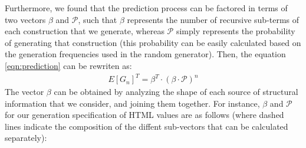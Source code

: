 Furthermore, we found that the prediction process can be factored in terms of
two vectors $\beta$ and $\mathcal{P}$, such that $\beta$ represents the number
of recursive sub-terms of each construction that we generate, whereas
$\mathcal{P}$ simply represents the probability of generating that construction
(this probability can be easily calculated based on the generation frequencies
used in the random generator).
%
Then, the equation \ref{eqn:prediction} can be rewriten as:
%
\begin{align*}
  E[G_n]^T = \beta^T \cdot (\beta \cdot \mathcal{P})^{n}
\end{align*}
%
The vector $\beta$ can be obtained by analyzing the shape of each source of
structural information that we consider, and joining them together.
%
For instance, $\beta$ and $\mathcal{P}$ for our generation specification of HTML
values are as follows (where dashed lines indicate the composition of the
diffent sub-vectors that can be calculated separately):


